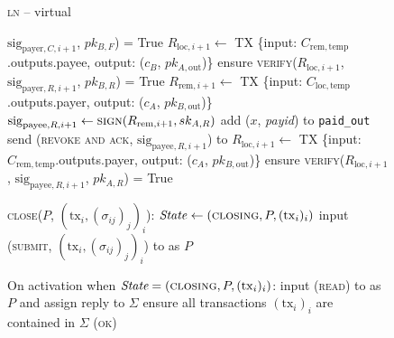 \begin{figure}[H]
\begin{processbox}{\textsc{ln} -- virtual}
\begin{algorithmic}[1]
        $\mathrm{sig}_{\mathrm{payer}, C, i+1}$, $pk_{B, F}$) = True
        \State $R_{\mathrm{loc}, i+1} \gets$ TX \{input: $C_{\mathrm{rem},
        \mathrm{temp}}$.outputs.payee, output: ($c_B$, $pk_{A,
        \mathrm{out}}$)\}
        \State ensure \textsc{verify}($R_{\mathrm{loc}, i+1}$,
        $\mathrm{sig}_{\mathrm{payer}, R, i+1}$, $pk_{B, R}$) = True
        \State $R_{\mathrm{rem}, i+1} \gets$ TX \{input: $C_{\mathrm{loc},
        \mathrm{temp}}$.outputs.payer, output: ($c_A$, $pk_{B, \mathrm{out}}$)\}
        \State $\mathrm{sig}_{\mathrm{payee}, R, i+1} \gets
        \textsc{sign}(R_{\mathrm{rem}, i+1}, sk_{A, R})$
        \State add ($x$, \textit{payid}) to \texttt{paid\_out}
        \State send (\textsc{revoke and ack}, $\mathrm{sig}_{\mathrm{payee}, R,
        i+1}$) to \bob
        \State $R_{\mathrm{loc}, i+1} \gets$ TX \{input: $C_{\mathrm{rem},
        \mathrm{temp}}$.outputs.payer, output: ($c_A$, $pk_{B,
        \mathrm{out}}$)\}
        \State ensure \textsc{verify}($R_{\mathrm{loc}, i+1}$,
        $\mathrm{sig}_{\mathrm{payee}, R, i+1}$, $pk_{A, R}$) = True
        \State {}
      \EndIndent
      \Statex

      \State \textsc{close}($P$, $(\mathrm{tx}_i, (\sigma_{ij})_j)_i$):
      \Indent
        \State {}
        \State $\mathit{State} \gets (\textsc{closing}, P, (\mathrm{tx}_i)_i)$
        \State input (\textsc{submit}, $(\mathrm{tx}_i, (\sigma_{ij})_j)_i$)
        to \ledger as $P$
      \EndIndent
      \Statex

      \State On activation when $\textit{State} = (\textsc{closing}, P,
      (\mathrm{tx}_i)_i)$:
      \Indent
        \State input (\textsc{read}) to \ledger as $P$ and assign reply to
        $\Sigma$
        \State ensure all transactions $(\mathrm{tx}_i)_i$ are contained in
        $\Sigma$
        \State \Return (\textsc{ok})
      \EndIndent
    \end{algorithmic}
  \end{processbox}
  \caption{}
  \label{code:ln:virtual}
\end{figure}
